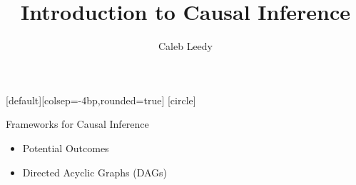 \documentclass[handout]{beamer} %
\author[CL]{Caleb Leedy}
\title[Background]{Introduction to Causal Inference}
\begin{document}
\everymath{\displaystyle}
[default][colsep=-4bp,rounded=true]
[circle]
\frame{\titlepage}

%
%
%
%
%

%
%
%
%
%
%
%
%

\begin{frame}{Frameworks for Causal Inference}

{

\begin{itemize}
    \item<1-2> Potential Outcomes
    \item<1> Directed Acyclic Graphs (DAGs)
\end{itemize}
}

\end{frame}
\end{document}
